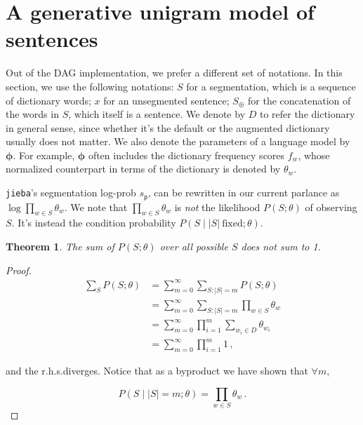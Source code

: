 \documentclass{article}
\newcommand{\jb}{\texttt{jieba}}
\newtheorem{theorem}{Theorem}
\begin{document}
\section{A generative unigram model of sentences}
Out of the DAG implementation, we prefer a different set of notations.
In this section, we use the following notations:\@
$S$ for a segmentation, which is a sequence of dictionary words;
$x$ for an unsegmented sentence;
$S_\oplus$ for the concatenation of the words in $S$, which itself is a sentence.
We denote by $D$ to refer the dictionary in general sense, since whether it's the default or the augmented dictionary usually does not matter.
We also denote the parameters of a language model by $\boldsymbol\phi$.
For example, $\boldsymbol\phi$ often includes the dictionary frequency scores $f_w$, whose normalized counterpart in terms of the dictionary is denoted by $\theta_w$.

\jb's segmentation log-prob $s_\mathsf{p}$, can be rewritten in our current parlance as $\log \prod_{w \in S} \theta_w$.
We note that $\prod_{w \in S} \theta_w$ is \emph{not} the likelihood $P(S; \theta)$ of observing $S$.
It's instead the condition probability $P(S \mid |S|\ \text{fixed}; \theta)$.

\begin{theorem}
    The sum of $P(S; \theta)$ over all possible $S$ does not sum to 1.
\end{theorem}
\begin{proof}
    \[
        \begin{aligned}
            \sum_S P(S; \theta)
            &= \sum_{m=0}^\infty \sum_{S: |S|=m} P(S; \theta)\\
            &= \sum_{m=0}^\infty \sum_{S: |S|=m} \prod_{w \in S} \theta_w\\
            &= \sum_{m=0}^\infty \prod_{i=1}^m \sum_{w_i \in D} \theta_{w_i}\\
            &= \sum_{m=0}^\infty \prod_{i=1}^m 1\,,
        \end{aligned}
    \]
    
    \noindent
    and the r.h.s.\@ diverges.
    Notice that as a byproduct we have shown that $\forall m$,

    \[
        P(S \mid |S|=m; \theta) = \prod_{w \in S} \theta_w\,.
    \]
\end{proof}
\end{document}
